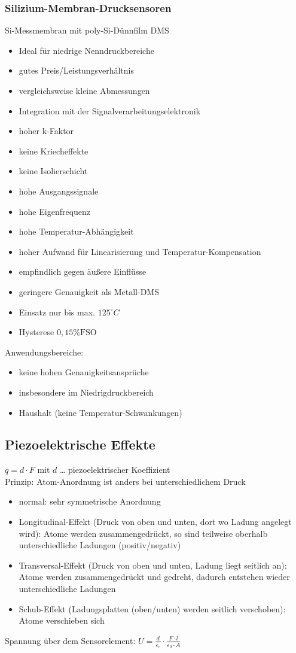 \subsubsection{Silizium-Membran-Drucksensoren}
Si-Messmembran mit poly-Si-Dünnfilm DMS
\begin{itemize}[label=$+$]
\item Ideal für niedrige Nenndruckbereiche
\item gutes Preis/Leistungsverhältnis
\item vergleichsweise kleine Abmessungen
\item Integration mit der Signalverarbeitungselektronik
\item hoher k-Faktor
\item keine Kriecheffekte
\item keine Isolierschicht
\item hohe Ausgangssignale
\item hohe Eigenfrequenz
\end{itemize}
\begin{itemize}[label=$-$]
\item hohe Temperatur-Abhängigkeit
\item hoher Aufwand für Linearisierung und Temperatur-Kompensation
\item empfindlich gegen äußere Einflüsse
\item geringere Genauigkeit als Metall-DMS
\item Einsatz nur bis max. $125^\circ C$
\item Hysterese $0,15\% \mathrm{FSO}$
\end{itemize}
Anwendungsbereiche:
\begin{itemize}
\item keine hohen Genauigkeitsansprüche
\item insbesondere im Niedrigdruckbereich
\item Haushalt (keine Temperatur-Schwankungen)
\end{itemize}

\subsection{Piezoelektrische Effekte}
$q=d\cdot F$ mit $d$ … piezoelektrischer Koeffizient\\
Prinzip: Atom-Anordnung ist anders bei unterschiedlichem Druck
\begin{itemize}
\item normal: sehr symmetrische Anordnung
\item Longitudinal-Effekt (Druck von oben und unten, dort wo Ladung angelegt wird): Atome werden zusammengedrückt, so sind teilweise oberhalb unterschiedliche Ladungen (positiv/negativ)
\item Transversal-Effekt (Druck von oben und unten, Ladung liegt seitlich an): Atome werden zusammengedrückt und gedreht, dadurch entstehen wieder unterschiedliche Ladungen
\item Schub-Effekt (Ladungsplatten (oben/unten) werden seitlich verschoben): Atome verschieben sich
\end{itemize}
Spannung über dem Sensorelement: $U=\frac{d}{\varepsilon_r}\cdot \frac{F \cdot l}{\varepsilon_0 \cdot A}$

